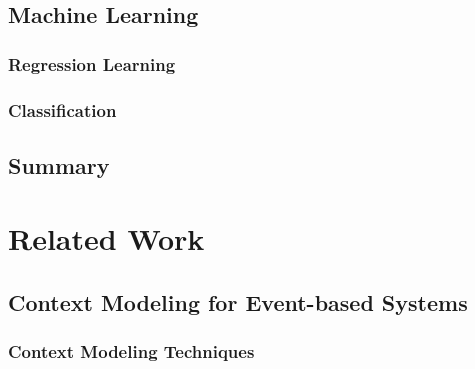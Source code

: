 \section{Machine Learning}
\subsection{Regression Learning}
\subsection{Classification}

\section{Summary}


\chapter{Related Work}

\section{Context Modeling for Event-based Systems}

\subsection{Context Modeling Techniques}

